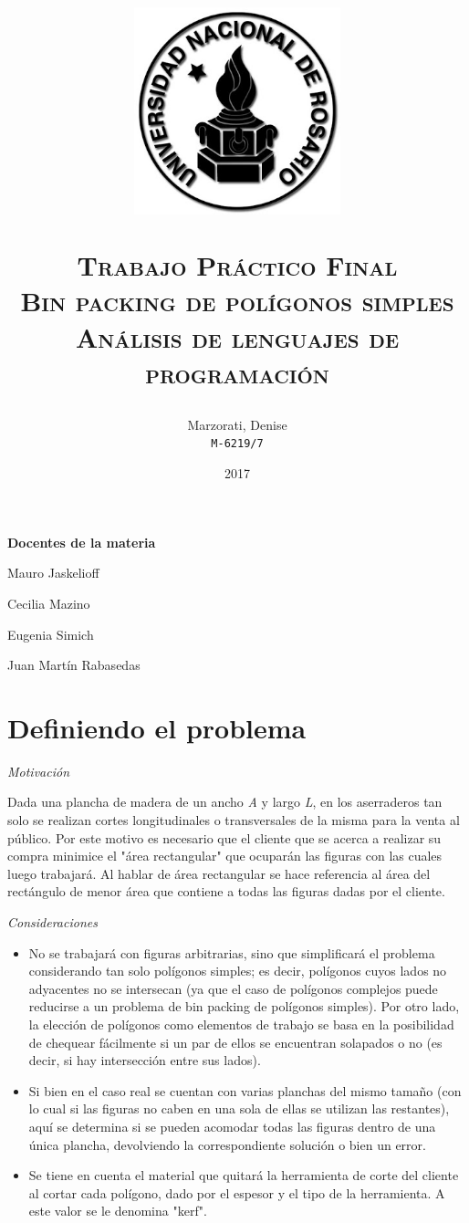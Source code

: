 \documentclass[a4paper,10pt]{article}
\author{
    Marzorati, Denise \\
    \texttt{M-6219/7}
}
\date{
    2017
}
\title{
    \begin{center}
    \includegraphics[width=6cm, height=6cm]{logo-unr.png}
    \end{center}
    \Huge \textsc{{\bfseries T}rabajo {\bfseries P}ráctico {\bfseries F}inal} \\
    \Huge \textsc{Bin packing de polígonos simples} \\
    \large \textsc{Análisis de lenguajes de programación} \\
}
\begin{document}
\bigskip
\bigskip
\bigskip

\maketitle

\thispagestyle{empty}

\begin{center}
\large \bf Docentes de la materia
\end{center}

\begin{center}

Mauro Jaskelioff

Cecilia Mazino

Eugenia Simich

Juan Martín Rabasedas

\end{center}

\large
\newpage{}

\section*{Definiendo el problema}

\textit {Motivación}

    \smallskip
    Dada una plancha de madera de un ancho \textit{A} y largo \textit{L}, en los aserraderos tan solo se
    realizan cortes longitudinales o transversales de la misma para la venta al público. Por este motivo es
    necesario que el cliente que se acerca a realizar su compra minimice el "área rectangular" que ocuparán
    las figuras con las cuales luego trabajará. Al hablar de área rectangular se hace referencia al área del 
    rectángulo de menor área que contiene a todas las figuras dadas por el cliente.

\medskip
\textit {Consideraciones}

    \smallskip
    \begin{itemize}
        \item No se trabajará con figuras arbitrarias, sino que simplificará el problema considerando tan solo
    polígonos simples; es decir, polígonos cuyos lados no adyacentes no se intersecan (ya que el caso de
    polígonos complejos puede reducirse a un problema de bin packing de polígonos simples). Por
    otro lado, la elección de polígonos como elementos de trabajo se basa en la posibilidad de chequear
    fácilmente si un par de ellos se encuentran solapados o no (es decir, si hay intersección entre sus lados).
        \item Si bien en el caso real se cuentan con varias planchas del mismo tamaño (con lo cual si las
    figuras no caben en una sola de ellas se utilizan las restantes), aquí se determina si se pueden acomodar
    todas las figuras dentro de una única plancha, devolviendo la correspondiente solución o bien un error.
        \item Se tiene en cuenta el material que quitará la herramienta de corte del cliente al cortar cada
    polígono, dado por el espesor y el tipo de la herramienta. A este valor se le denomina "kerf". 
    \end{itemize}
\end{document}
